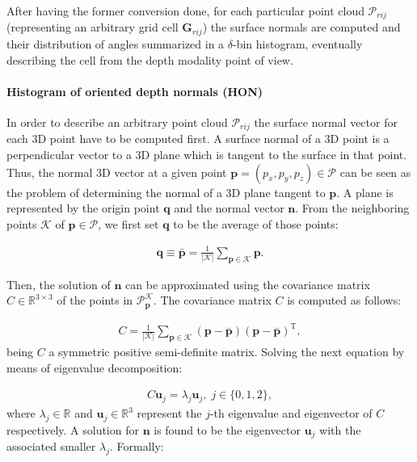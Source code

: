 \documentclass[10pt,twocolumn,letterpaper]{article}
\begin{document}
After having the former conversion done, for each particular point cloud $\mathcal{P}_{rij}$ (representing an arbitrary grid cell $\mathbf{G}_{rij}$) the surface normals are computed and their distribution of angles summarized in a $\delta$-bin histogram, eventually describing the cell from the depth modality point of view.

\paragraph{Histogram of oriented depth normals (HON)} 
In order to describe an arbitrary point cloud $\mathcal{P}_{rij}$ the surface normal vector for each 3D point have to be computed first. A surface normal of a 3D point is a perpendicular vector to a 3D plane which is tangent to the surface in that point. Thus, the normal 3D vector at a given point $\mathbf{p} = (p_x, p_y, p_z) \in \mathcal{P}$ can be seen as the problem of determining the normal of a 3D plane tangent to $\mathbf{p}$. A plane is represented by the origin point $\mathbf{q}$ and the normal vector $\mathbf{n}$. From the neighboring points $\mathcal{K}$ of $\mathbf{p} \in \mathcal{P}$, we first set $\mathbf{q}$ to be the average of those points:

\begin{gather}
	\mathbf{q} \equiv \bar{\mathbf{p}} = \frac{1}{|\mathcal{K}|} \sum_{\mathbf{p} \in \mathcal{K}} \mathbf{p}.
\end{gather}
 
Then, the solution of $\mathbf{n}$ can be approximated using the covariance matrix $C \in \mathbb{R}^{3 \times 3}$ of the points in $\mathcal{P}_\mathbf{p}^{\mathcal{K}}$. The covariance matrix $C$ is computed as follows: 

\begin{gather}
	C = \frac{1}{|\mathcal{K}|} \sum_{\mathbf{p} \in \mathcal{K}} (\mathbf{p} - \bar{\mathbf{p}}) (\mathbf{p} - \bar{\mathbf{p}})^{\mathrm{T}},
\end{gather}
being $C$ a symmetric positive semi-definite matrix. Solving the next equation by means of eigenvalue decomposition:

\begin{gather}
	C \mathbf{u}_j = \lambda_j \mathbf{u}_j, \; j \in \{0,1,2\},
\end{gather}
where $\lambda_j \in \mathbb{R}$ and $\mathbf{u}_j \in \mathbb{R}^3$ represent the $j$-th eigenvalue and eigenvector of $C$ respectively. A solution for $\mathbf{n}$ is found to be the eigenvector $\mathbf{u}_j$ with the associated smaller $\lambda_j$. Formally:
\end{document}
